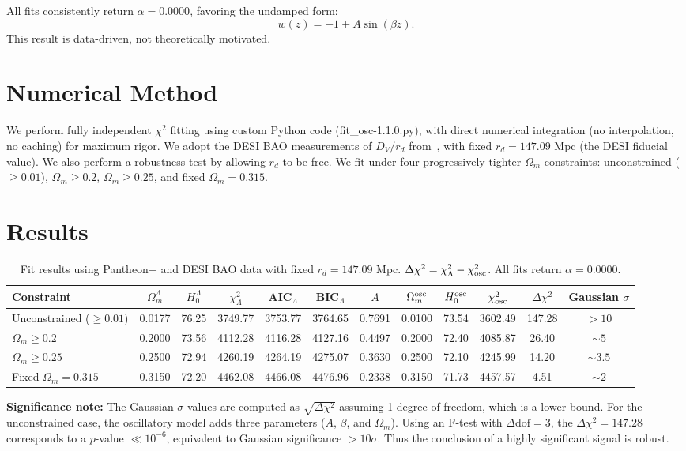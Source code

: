 \documentclass[10pt,a4paper,twocolumn]{article}
\begin{document}
All fits consistently return $\alpha=0.0000$, favoring the undamped form:
\[
w(z) = -1 + A\sin(\beta z).
\]
This result is data-driven, not theoretically motivated.

\section{Numerical Method}
We perform fully independent $\chi^2$ fitting using custom Python code (fit\_osc-1.1.0.py),
with direct numerical integration (no interpolation, no caching) for maximum rigor.
We adopt the DESI BAO measurements of $D_V/r_d$ from~\cite{DESI2024}, with fixed $r_d = 147.09$ Mpc (the DESI fiducial value).
We also perform a robustness test by allowing $r_d$ to be free.
We fit under four progressively tighter $\Omega_m$ constraints:
unconstrained ($\ge0.01$), $\Omega_m\ge0.2$, $\Omega_m\ge0.25$, and fixed $\Omega_m=0.315$.

\section{Results}
\begin{table}[ht]
\centering
\caption{Fit results using Pantheon+ and DESI BAO data with fixed $r_d=147.09$ Mpc.
$\Delta\chi^2 = \chi^2_{\Lambda} - \chi^2_{\rm osc}$.
All fits return $\alpha=0.0000$.}
\label{tab:results}
\begin{tabular}{lcccccccccc>{\bfseries}c}
\toprule
Constraint
& $\Omega_m^\Lambda$ & $H_0^\Lambda$ & $\chi^2_\Lambda$
& AIC$_\Lambda$ & BIC$_\Lambda$
& $A$ & $\Omega_m^{\rm osc}$ & $H_0^{\rm osc}$ & $\chi^2_{\rm osc}$
& $\Delta\chi^2$ & Gaussian $\sigma$ \\
\midrule
Unconstrained ($\ge0.01$)
& 0.0177 & 76.25 & 3749.77
& 3753.77 & 3764.65
& 0.7691 & 0.0100 & 73.54 & 3602.49
& 147.28 & $>10$ \\
$\Omega_m\ge0.2$
& 0.2000 & 73.56 & 4112.28
& 4116.28 & 4127.16
& 0.4497 & 0.2000 & 72.40 & 4085.87
& 26.40 & $\sim5$ \\
$\Omega_m\ge0.25$
& 0.2500 & 72.94 & 4260.19
& 4264.19 & 4275.07
& 0.3630 & 0.2500 & 72.10 & 4245.99
& 14.20 & $\sim3.5$ \\
Fixed $\Omega_m=0.315$
& 0.3150 & 72.20 & 4462.08
& 4466.08 & 4476.96
& 0.2338 & 0.3150 & 71.73 & 4457.57
& 4.51 & $\sim2$ \\
\bottomrule
\end{tabular}
\end{table}

\noindent
\textbf{Significance note:} The Gaussian $\sigma$ values are computed as $\sqrt{\Delta\chi^2}$ assuming 1 degree of freedom, which is a lower bound. For the unconstrained case, the oscillatory model adds three parameters ($A$, $\beta$, and $\Omega_m$). Using an F-test with $\Delta\mathrm{dof}=3$, the $\Delta\chi^2=147.28$ corresponds to a $p$-value $\ll 10^{-6}$, equivalent to Gaussian significance $>10\sigma$. Thus the conclusion of a highly significant signal is robust.
\end{document}
